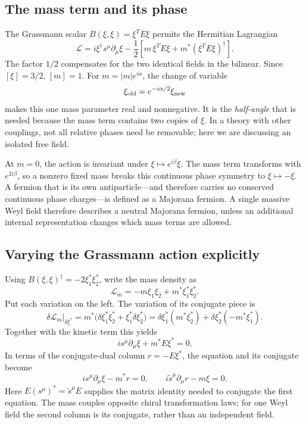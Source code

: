 \documentclass[11pt]{article}
\newcommand{\Lag}{\mathcal{L}}
\begin{document}
\subsection{The mass term and its phase}
The Grassmann scalar \(B(\xi,\xi)=\xi^T E\xi\) permits the Hermitian Lagrangian
\begin{equation}
 \boxed{\Lag=i\xi^\dagger s^\mu\partial_\mu\xi
       -\frac12\left[m\,\xi^T E\xi
                   +m^*(\xi^T E\xi)^\dagger\right].}
 \label{weyl:eq:weylmass}
\end{equation}
The factor \(1/2\) compensates for the two identical fields in the
bilinear. Since \([\xi]=3/2\), \([m]=1\).
For \(m=|m|e^{i\alpha}\), the change of variable
\begin{equation}
 \xi_{\rm old}=e^{-i\alpha/2}\xi_{\rm new}
 \label{weyl:eq:phase}
\end{equation}
makes this one mass parameter real and nonnegative. It is the
\emph{half-angle} that is needed because the mass term contains two
copies of \(\xi\). In a theory with other couplings, not all relative
phases need be removable; here we are discussing an isolated free field.

At $m=0$, the action is invariant under $\xi \mapsto e^{i\beta} \xi$. The mass term transforms with $e^{2i\beta}$, so a nonzero fixed mass breaks this continuous phase symmetry to $\xi \mapsto -\xi$. A fermion that is its own antiparticle—and therefore carries no conserved continuous phase charges—is defined as a Majorana fermion. A single massive Weyl field therefore describes a neutral Majorana fermion, unless an additional internal representation changes which mass terms are allowed.

\subsection{Varying the Grassmann action explicitly}
Using \(B(\xi,\xi)^\dagger=-2\xi_1^*\xi_2^*\), write the mass density as
\[
 \Lag_m=-m\xi_1\xi_2+m^*\xi_1^*\xi_2^*.
\]
Put each variation on the left. The variation of its conjugate piece is
\[
 \delta\Lag_m\big|_{\delta\xi^*}
  =m^*\big(\delta\xi_1^*\xi_2^*+\xi_1^*\delta\xi_2^*\big)
  =\delta\xi_1^*(m^*\xi_2^*)
        +\delta\xi_2^*(-m^*\xi_1^*).
\]
Together with the kinetic term this yields
\begin{equation}
 \boxed{i s^\mu\partial_\mu\xi+m^*E\xi^*=0.}
 \label{weyl:eq:weyleom}
\end{equation}
In terms of the conjugate-dual column \(r=-E\xi^*\), the equation and
its conjugate become
\begin{equation}
 i s^\mu\partial_\mu\xi-m^*r=0,
 \qquad i\widetilde s^\mu\partial_\mu r-m\xi=0.
 \label{weyl:eq:coupled}
\end{equation}
Here \(E(s^\mu)^*=\widetilde s^\mu E\) supplies the matrix identity
needed to conjugate the first equation. The mass couples opposite
chiral transformation laws; for one Weyl field the second column is
its conjugate, rather than an independent field.
\end{document}

